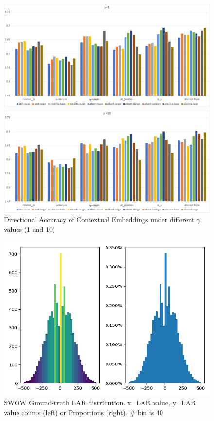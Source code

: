 \documentclass[letterpaper]{article} %
\begin{document}
\begin{figure}[!]
\centering

\begin{minipage}[b]{\textwidth}
  \includegraphics[width=\linewidth]{dir_gamma1.png}
\end{minipage}
\hfill

\begin{minipage}[b]{\textwidth}
  \includegraphics[width=\linewidth]{dir_gamma10.png}
\end{minipage}
\caption{Directional Accuracy of Contextual Embeddings under different $\gamma$ values (1 and 10)}
\label{fig:dirgamma2}
\end{figure}

\begin{figure}[!]
\centering
  \includegraphics[width=0.5\linewidth]{gtSWOW_roberta_large.png}
  \caption{SWOW Ground-truth LAR distribution. x=LAR value, y=LAR value counts (left) or Proportions (right). \# bin is 40}
  \label{fig:largt}
\end{figure}
\end{document}
